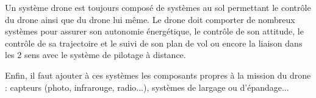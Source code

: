 \begin{center}
\begin{minipage}[c]{1.0\linewidth}
\begin{figure}[H]
\begin{minipage}[c]{0.5\linewidth}
		\end{minipage}
		\end{figure}
		\end{minipage}
		\end{center}

Un système drone est toujours composé de systèmes au sol permettant le contrôle du drone ainsi que du drone lui même. Le drone doit comporter de nombreux systèmes pour assurer son autonomie énergétique, le contrôle de son attitude, le contrôle de sa trajectoire et le suivi de son plan de vol ou encore la liaison dans les 2 sens avec le système de pilotage à distance. 

Enfin, il faut ajouter à ces systèmes les composants propres à la mission du drone : capteurs (photo, infrarouge, radio...), systèmes de largage ou d'épandage...
